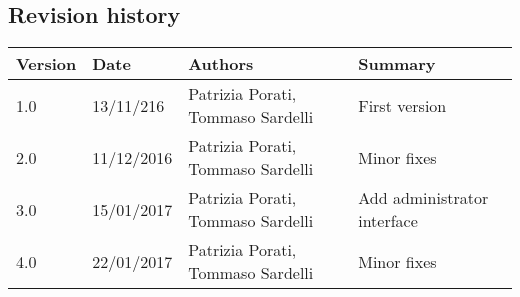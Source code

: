 \subsection{Revision history}
\begin{tabular}{|l|l|l|l|}
	\hline
	\textbf{Version}	& \textbf{Date}	& \textbf{Authors}	& \textbf{Summary}\\
	\hline
	1.0 	& 13/11/216 	& Patrizia Porati, Tommaso Sardelli 	& First version\\
	\hline
	2.0 	& 11/12/2016 	& Patrizia Porati, Tommaso Sardelli 	& Minor fixes\\
	\hline
	3.0		& 15/01/2017 	& Patrizia Porati, Tommaso Sardelli 	& Add administrator interface\\
	\hline
	4.0 	& 22/01/2017 	& Patrizia Porati, Tommaso Sardelli 	& Minor fixes\\
	\hline
\end{tabular}